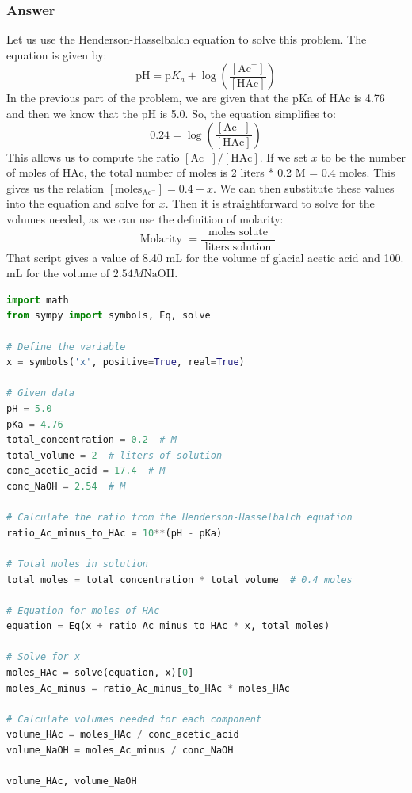\documentclass[12pt]{article}
\begin{document}
\subsubsection{Answer}
Let us use the Henderson-Hasselbalch equation to solve this problem. The equation is given by:
\begin{equation}
  \mathrm{pH} = \mathrm{p}K_{a}+\log \left(\frac{[\mathrm{Ac}^{-}]}{[\mathrm{HAc}]}\right)
\end{equation}
In the previous part of the problem, we are given that the pKa of HAc is 4.76 and then we know that the pH is 5.0. So, the equation simplifies to:
\begin{equation}
  0.24 = \log \left(\frac{[\mathrm{Ac}^{-}]}{[\mathrm{HAc}]}\right)
\end{equation}
This allows us to compute the ratio $[\mathrm{Ac}^{-}] / [\mathrm{HAc}]$. If we set $x$ to be the number of moles of HAc, the total number of moles is 2 liters * 0.2 M = 0.4 moles. This gives us the relation $[\text{moles}_{\mathrm{Ac}^{-}}] = 0.4 - x$. We can then substitute these values into the equation and solve for $x$. Then it is straightforward to solve for the volumes needed, as we can use the definition of molarity:
\begin{equation}
  \text { Molarity }=\frac{\text { moles solute }}{\text { liters solution }}
\end{equation}
That script gives a value of 8.40 mL for the volume of glacial acetic acid and 100. mL for the volume of $2.54 M \mathrm{NaOH}$.
\begin{lstlisting}[language=Python]
import math
from sympy import symbols, Eq, solve

# Define the variable
x = symbols('x', positive=True, real=True)

# Given data
pH = 5.0
pKa = 4.76
total_concentration = 0.2  # M
total_volume = 2  # liters of solution
conc_acetic_acid = 17.4  # M
conc_NaOH = 2.54  # M

# Calculate the ratio from the Henderson-Hasselbalch equation
ratio_Ac_minus_to_HAc = 10**(pH - pKa)

# Total moles in solution
total_moles = total_concentration * total_volume  # 0.4 moles

# Equation for moles of HAc
equation = Eq(x + ratio_Ac_minus_to_HAc * x, total_moles)

# Solve for x
moles_HAc = solve(equation, x)[0]
moles_Ac_minus = ratio_Ac_minus_to_HAc * moles_HAc

# Calculate volumes needed for each component
volume_HAc = moles_HAc / conc_acetic_acid
volume_NaOH = moles_Ac_minus / conc_NaOH

volume_HAc, volume_NaOH

\end{lstlisting}
\end{document}
